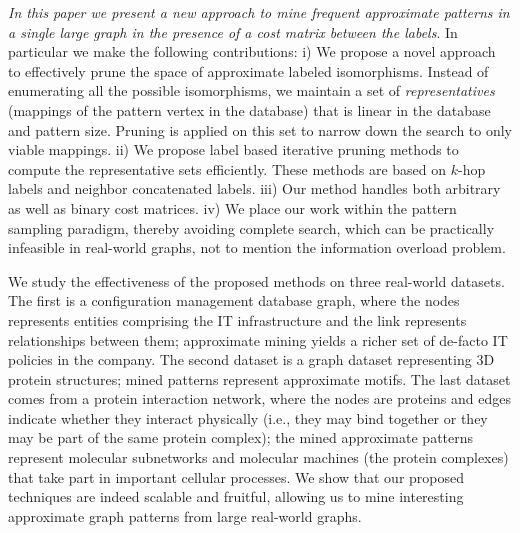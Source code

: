{\em In this paper we present a new approach to mine frequent
approximate patterns in a single large graph in the presence of a cost
matrix between the labels}. In particular we make the following
contributions: i) We propose a novel approach to effectively prune the
space of approximate labeled isomorphisms. Instead of enumerating all
the possible isomorphisms, we maintain a set of {\em representatives}
(mappings of the pattern vertex in the database) that is linear in
the database and pattern size. Pruning is applied on this set to narrow
down the search to only viable mappings.  
ii) We propose label based iterative 
pruning methods to compute the representative
sets efficiently. These methods are based on $k$-hop labels and neighbor
concatenated labels.
iii) Our method handles both arbitrary as well as binary cost
matrices.  iv) We place our work within the pattern sampling paradigm,
thereby avoiding complete search, which can be practically infeasible in
real-world graphs, not to mention the information overload problem.

We study the effectiveness of the proposed methods on three real-world
datasets. The first is a configuration management database graph, where
the nodes represents entities comprising the IT infrastructure and the
link represents relationships between them; approximate mining yields a
richer set of de-facto IT policies in the company. The second dataset is
a graph dataset representing 3D protein structures; mined patterns
represent approximate motifs. The last dataset comes from a protein
interaction network, where the nodes are proteins and edges indicate
whether they interact physically (i.e., they may bind together or they
may be part of the same protein complex); the mined approximate patterns
represent molecular subnetworks and molecular machines (the protein
complexes) that take part in important cellular processes. We show that
our proposed techniques are indeed scalable and fruitful, allowing us to
mine interesting approximate graph patterns from large real-world
graphs.
